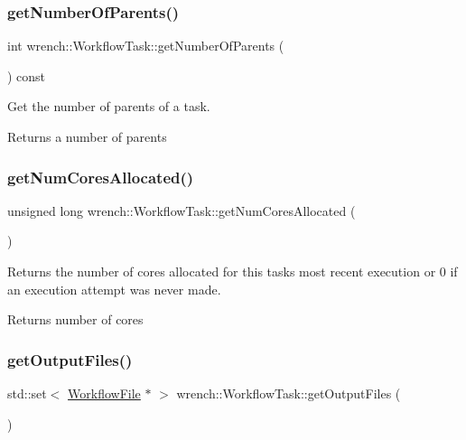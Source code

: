 \subsubsection{\texorpdfstring{get\+Number\+Of\+Parents()}{getNumberOfParents()}}
{\footnotesize\ttfamily int wrench\+::\+Workflow\+Task\+::get\+Number\+Of\+Parents (\begin{DoxyParamCaption}{ }\end{DoxyParamCaption}) const}



Get the number of parents of a task. 

\begin{DoxyReturn}{Returns}
a number of parents 
\end{DoxyReturn}
\mbox{\label{classwrench_1_1_workflow_task_a0c897ccd9bf60ae8e30ad28d99e573f9}} 
\subsubsection{\texorpdfstring{get\+Num\+Cores\+Allocated()}{getNumCoresAllocated()}}
{\footnotesize\ttfamily unsigned long wrench\+::\+Workflow\+Task\+::get\+Num\+Cores\+Allocated (\begin{DoxyParamCaption}{ }\end{DoxyParamCaption})}



Returns the number of cores allocated for this task\textquotesingle{}s most recent execution or 0 if an execution attempt was never made. 

\begin{DoxyReturn}{Returns}
number of cores 
\end{DoxyReturn}
\mbox{\label{classwrench_1_1_workflow_task_ade05bf520e4cda9a4d7aeaa8ffaa5855}} 
\subsubsection{\texorpdfstring{get\+Output\+Files()}{getOutputFiles()}}
{\footnotesize\ttfamily std\+::set$<$ \hyperlink{classwrench_1_1_workflow_file}{Workflow\+File} $\ast$ $>$ wrench\+::\+Workflow\+Task\+::get\+Output\+Files (\begin{DoxyParamCaption}{ }\end{DoxyParamCaption})}



